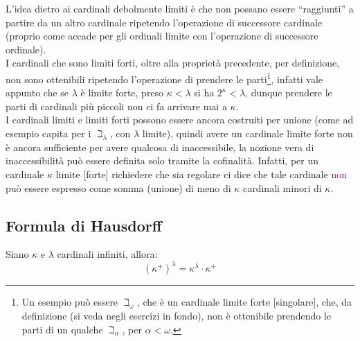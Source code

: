 \begin{remark}
	L'idea dietro ai cardinali debolmente limiti è che non possano essere ``raggiunti'' a partire da un altro cardinale ripetendo l'operazione di successore cardinale (proprio come accade per gli ordinali limite con l'operazione di successore ordinale).\\
	I cardinali che sono limiti forti, oltre alla proprietà precedente, per definizione, non sono ottenibili ripetendo l'operazione di prendere le parti\footnote{Un esempio può essere $\beth_\omega$, che è un cardinale limite forte [singolare], che, da definizione (si veda negli esercizi in fondo), non è ottenibile prendendo le parti di un qualche $\beth_\alpha$, per $\alpha < \omega$.},
	infatti vale appunto che se $\lambda$ è limite forte, preso $\kappa < \lambda$ si ha $2^\kappa < \lambda$, dunque prendere le parti di cardinali più piccoli non ci fa arrivare mai a $\kappa$.\\
	I cardinali limiti e limiti forti possono essere ancora costruiti per unione (come ad esempio capita per i $\beth_\lambda$, con $\lambda$ limite), quindi avere un cardinale limite forte non è ancora sufficiente per avere qualcosa di inaccessibile, la nozione vera di inaccessibilità può essere definita solo tramite la cofinalità. Infatti,
	per un cardinale $\kappa$ limite [forte] richiedere che sia regolare ci dice che tale cardinale \textcolor{purple}{non} può essere espresso come somma (unione) di meno di $\kappa$ cardinali minori di $\kappa$.
\end{remark}

\pagebreak
\subsection{Formula di Hausdorff}

\begin{proposition}
	Siano $\kappa$ e $\lambda$ cardinali infiniti, allora:
	\[ (\kappa^+)^\lambda = \kappa^{\lambda} \cdot \kappa^+
		\]
\end{proposition}

